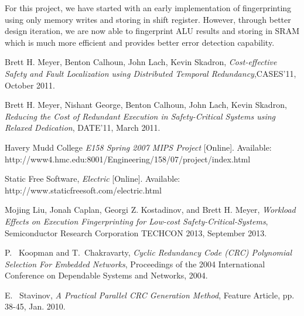 \documentclass[10pt,journal,compsoc]{IEEEtran}
\begin{document}
For this project, we have started with an early implementation of fingerprinting using only memory writes and storing in shift register. However, through better design iteration, we are now able to fingerprint ALU results and storing in SRAM which is much more efficient and provides better error detection capability.



\begin{thebibliography}{1}


 Brett H. Meyer, Benton Calhoun, John Lach, Kevin Skadron, \emph{Cost-effective Safety and Fault Localization using Distributed Temporal Redundancy},CASES'11, October 2011.

Brett H. Meyer, Nishant George, Benton Calhoun, John Lach, Kevin Skadron, \emph{Reducing the Cost of Redundant Execution in Safety-Critical Systems using Relaxed Dedication}, DATE'11, March 2011.


Havery Mudd College \emph{E158 Spring 2007 MIPS Project} [Online]. Available: http://www4.hmc.edu:8001/Engineering/158/07/project/index.html

Static Free Software, \emph{Electric} [Online]. Available: http://www.staticfreesoft.com/electric.html

Mojing Liu, Jonah Caplan, Georgi Z. Kostadinov, and Brett H. Meyer, \emph{Workload Effects on Execution Fingerprinting for Low-cost Safety-Critical-Systems},  Semiconductor Research Corporation TECHCON 2013, September 2013.

P. ~Koopman and T.~Chakravarty, \emph{Cyclic Redundancy Code ({CRC}) Polynomial Selection For Embedded Networks}, Proceedings of the 2004 International Conference on Dependable Systems and Networks, 2004.

E. ~Stavinov, \emph{A Practical Parallel {CRC} Generation Method}, Feature Article, pp. 38-45, Jan. 2010. 

\end{thebibliography}









\end{document}
